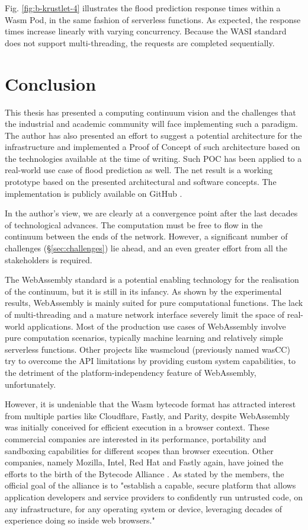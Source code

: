 Fig. \ref{fig:b-krustlet-4} illustrates the flood prediction response times within a Wasm Pod, in the same fashion of serverless functions. As expected, the response times increase linearly with varying concurrency. Because the WASI standard does not support multi-threading, the requests are completed sequentially.

\section{Conclusion}
\label{sec:conclusion}

This thesis has presented a computing continuum vision and the challenges that the industrial and academic community will face implementing such a paradigm. The author has also presented an effort to suggest a potential architecture for the infrastructure and implemented a Proof of Concept of such architecture based on the technologies available at the time of writing. Such POC has been applied to a real-world use case of flood prediction as well. The net result is a working prototype based on the presented architectural and software concepts. The implementation is publicly available on GitHub \cite{fedra-thesis}. 

In the author's view, we are clearly at a convergence point after the last decades of technological advances. The computation must be free to flow in the continuum between the ends of the network. However, a significant number of challenges (§\ref{sec:challenges}) lie ahead, and an even greater effort from all the stakeholders is required.

The WebAssembly standard is a potential enabling technology for the realisation of the continuum, but it is still in its infancy. As shown by the experimental results, WebAssembly is mainly suited for pure computational functions. The lack of multi-threading and a mature network interface severely limit the space of real-world applications. Most of the production use cases of WebAssembly involve pure computation scenarios, typically machine learning and relatively simple serverless functions. Other projects like wasmcloud \cite{wasmcloud} (previously named wasCC) try to overcome the API limitations by providing custom system capabilities, to the detriment of the platform-independency feature of WebAssembly, unfortunately.

However, it is undeniable that the Wasm bytecode format has attracted interest from multiple parties like Cloudflare, Fastly, and Parity, despite WebAssembly was initially conceived for efficient execution in a browser context. These commercial companies are interested in its performance, portability and sandboxing capabilities for different scopes than browser execution. Other companies, namely Mozilla, Intel, Red Hat and Fastly again, have joined the efforts to the birth of the Bytecode Alliance \cite{bytecode-alliance}. As stated by the members, the official goal of the alliance is to "establish a capable, secure platform that allows application developers and service providers to confidently run untrusted code, on any infrastructure, for any operating system or device, leveraging decades of experience doing so inside web browsers."

